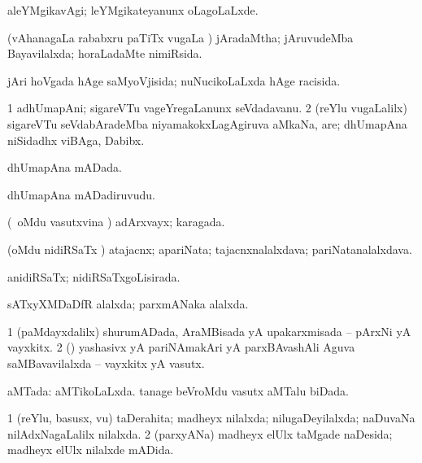 \bentry
{}
\gl{\kirxvi}
\bmng
aleYMgikavAgi; leYMgikateyanunx oLagoLaLxde. 
\emng
\eentry

\bentry
{}
\gl{\gu}
\bmng
(vAhanagaLa rababxru paTiTx \mo vugaLa \vi) jAradaMtha; jAruvudeMba Bayavilalxda; horaLadaMte nimiRsida. 
\emng
\eentry

\bentry
{}
\gl{\gu}
\bmng
jAri hoVgada hAge saMyoVjisida; nuNucikoLaLxda hAge racisida. 
\emng
\eentry

\bentry
{}
\gl{\nA}
\bmng
\bnum
\num{1} adhUmapAni; sigareVTu vageYregaLanunx seVdadavanu. 
\num{2} (reYlu \mo vugaLalilx) sigareVTu seVdabAradeMba niyamakokxLagAgiruva aMkaNa, are; dhUmapAna niSidadhx viBAga, Dabibx. 
\enum
\emng
\eentry

\bentry
{}
\gl{\gu}
\bmng
dhUmapAna mADada. 
\emng
\eentry

\bentry
{}
\gl{\nA}
\bmng
dhUmapAna mADadiruvudu. 
\emng
\eentry

\bentry
{}
\gl{\gu}
\bmng
(\kanmu\ oMdu vasutxvina \vi) adArxvayx; karagada. 
\emng
\eentry

\bentry
{}
\gl{\nA}
\bmng
(oMdu nidiRSaTx \vi) atajacnx; apariNata; tajacnxnalalxdava; pariNatanalalxdava. 
\emng
\eentry

\bentry
{}
\gl{\gu}
\bmng
anidiRSaTx; nidiRSaTxgoLisirada. 
\emng
\eentry

\bentry
{}
\gl{\gu}
\bmng
sATxyXMDaDfR alalxda; parxmANaka alalxda. 
\emng
\eentry

\bentry
{}
\gl{\nA}
\bmng
\bnum
\num{1} (paMdayxdalilx) shurumADada, AraMBisada yA upakarxmisada -- pArxNi yA vayxkitx. 
\num{2} (\AmA) yashasivx yA pariNAmakAri yA parxBAvashAli Aguva saMBavavilalxda -- vayxkitx yA vasutx. 
\enum
\emng
\eentry

\bentry
{}
\gl{\gu}
\bmng
aMTada: 
\banum
{} aMTikoLaLxda. 
 tanage beVroMdu vasutx aMTalu biDada. 
\eanum
\emng
\eentry

\bentry
{}
\gl{\gu}
\bmng
\bnum
\num{1} (reYlu, basusx, \mo vu) taDerahita; madheyx nilalxda; nilugaDeyilalxda; naDuvaNa nilAdxNagaLalilx nilalxda. 
\num{2} (parxyANa) madheyx elUlx taMgade naDesida; madheyx elUlx nilalxde mADida. 
\enum
\emng
\eentry

